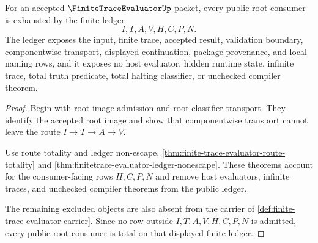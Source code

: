\begin{theorem}
\label{thm:finite-trace-evaluator-root-ledger-totality}
For an accepted $\FiniteTraceEvaluatorUp$ packet, every public root consumer is exhausted by the finite ledger
$$
I,T,A,V,H,C,P,N.
$$
The ledger exposes the input, finite trace, accepted result, validation boundary, componentwise transport, displayed continuation, package provenance, and local naming rows, and it exposes no host evaluator, hidden runtime state, infinite trace, total truth predicate, total halting classifier, or unchecked compiler theorem.
\end{theorem}
\begin{proof}
Begin with root image admission and root classifier transport. They identify the accepted root image and show that componentwise transport cannot leave the route $I \to T \to A \to V$.

Use route totality and ledger non-escape, \autoref{thm:finite-trace-evaluator-route-totality} and \autoref{thm:finitetrace-evaluator-ledger-nonescape}. These theorems account for the consumer-facing rows $H,C,P,N$ and remove host evaluators, infinite traces, and unchecked compiler theorems from the public ledger.

The remaining excluded objects are also absent from the carrier of \autoref{def:finite-trace-evaluator-carrier}. Since no row outside $I,T,A,V,H,C,P,N$ is admitted, every public root consumer is total on that displayed finite ledger.
\end{proof}
